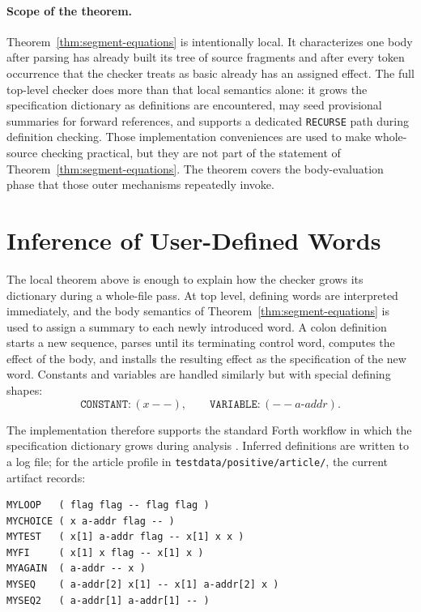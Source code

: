 \documentclass[acmsmall,screen,review,anonymous,nonacm]{acmart}
\begin{document}
\paragraph{Scope of the theorem.}
Theorem~\ref{thm:segment-equations} is intentionally local. It characterizes one body
after parsing has already built its tree of source fragments and after every token
occurrence that the checker treats as basic already has an assigned effect. The full top-level checker does more than that local
semantics alone: it grows the specification dictionary as definitions are encountered, may
seed provisional summaries for forward references, and supports a dedicated
\texttt{RECURSE} path during definition checking. Those implementation conveniences are
used to make whole-source checking practical, but they are not part of the statement of
Theorem~\ref{thm:segment-equations}. The theorem covers the body-evaluation phase that
those outer mechanisms repeatedly invoke.

\section{Inference of User-Defined Words}
The local theorem above is enough to explain how the checker grows its dictionary during a whole-file pass. At top level, defining words are interpreted immediately, and the body semantics of Theorem~\ref{thm:segment-equations} is used to assign a summary to each newly introduced word. A colon definition starts a new sequence, parses until its terminating control word, computes the effect of the body, and installs the resulting effect as the specification of the new word. Constants and variables are handled similarly but with special defining shapes:
\[
\texttt{CONSTANT} : (x --), \qquad \texttt{VARIABLE} : (-- a\text{-}addr).
\]

The implementation therefore supports the standard Forth workflow in which the specification dictionary grows during analysis \cite{forth2012standard}. Inferred definitions are written to a log file; for the article profile in \texttt{testdata/positive/article/}, the current artifact records:
\begin{lstlisting}
MYLOOP   ( flag flag -- flag flag )
MYCHOICE ( x a-addr flag -- )
MYTEST   ( x[1] a-addr flag -- x[1] x x )
MYFI     ( x[1] x flag -- x[1] x )
MYAGAIN  ( a-addr -- x )
MYSEQ    ( a-addr[2] x[1] -- x[1] a-addr[2] x )
MYSEQ2   ( a-addr[1] a-addr[1] -- )
\end{lstlisting}
\end{document}
